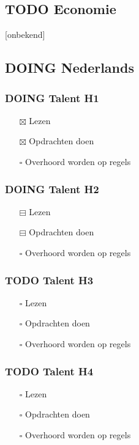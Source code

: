 \documentclass[11pt]{article}
\begin{document}
\subsection{{\bfseries\sffamily TODO} Economie}
\label{sec:orgfc2b4ae}
[onbekend]
\subsection{{\bfseries\sffamily DOING} Nederlands}
\label{sec:org165b37d}
\subsubsection{{\bfseries\sffamily DOING} Talent H1}
\label{sec:org2f8e193}
\begin{itemize}
\item[{$\boxtimes$}] Lezen
\item[{$\boxtimes$}] Opdrachten doen
\item[{$\square$}] Overhoord worden op regels
\end{itemize}
\subsubsection{{\bfseries\sffamily DOING} Talent H2}
\label{sec:orgd5dc906}
\begin{itemize}
\item[{$\boxminus$}] Lezen
\item[{$\boxminus$}] Opdrachten doen
\item[{$\square$}] Overhoord worden op regels
\end{itemize}
\subsubsection{{\bfseries\sffamily TODO} Talent H3}
\label{sec:org3837482}
\begin{itemize}
\item[{$\square$}] Lezen
\item[{$\square$}] Opdrachten doen
\item[{$\square$}] Overhoord worden op regels
\end{itemize}
\subsubsection{{\bfseries\sffamily TODO} Talent H4}
\label{sec:org2ceda10}
\begin{itemize}
\item[{$\square$}] Lezen
\item[{$\square$}] Opdrachten doen
\item[{$\square$}] Overhoord worden op regels
\end{itemize}
\end{document}
